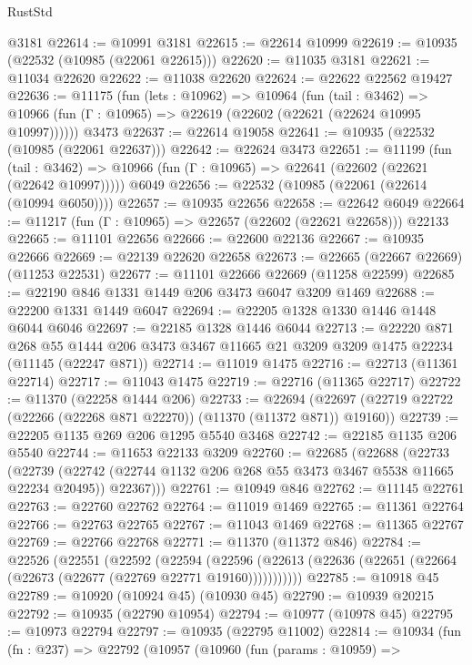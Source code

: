 \begin{lexlean}{RustStd}
\begin{coremodule}
{\begin{coremodule}
{{{{{{{{{{{{{{{{{{{{{{{{{{{{{{{{{{{{{{{{{{{{{{{{{{{{{{{{{{{{{{{{{{{{{{{{{{{{{{{{{{{{{    @3181
@22614 := @10991 @3181
@22615 := @22614 @10999
@22619 := @10935 (@22532 (@10985 (@22061 @22615)))
@22620 := @11035 @3181
@22621 := @11034 @22620
@22622 := @11038 @22620
@22624 := @22622 @22562 @19427
@22636 := @11175
    (fun (lets : @10962) =>
    @10964
      (fun (tail : @3462) =>
      @10966 (fun (Γ : @10965) => @22619 (@22602 (@22621 (@22624 @10995 @10997))))))
    @3473
@22637 := @22614 @19058
@22641 := @10935 (@22532 (@10985 (@22061 @22637)))
@22642 := @22624 @3473
@22651 := @11199
    (fun (tail : @3462) => @10966 (fun (Γ : @10965) => @22641 (@22602 (@22621 (@22642 @10997)))))
    @6049
@22656 := @22532 (@10985 (@22061 (@22614 (@10994 @6050))))
@22657 := @10935 @22656
@22658 := @22642 @6049
@22664 := @11217 (fun (Γ : @10965) => @22657 (@22602 (@22621 @22658))) @22133
@22665 := @11101 @22656
@22666 := @22600 @22136
@22667 := @10935 @22666
@22669 := @22139 @22620 @22658
@22673 := @22665 (@22667 @22669) (@11253 @22531)
@22677 := @11101 @22666 @22669 (@11258 @22599)
@22685 := @22190 @846 @1331 @1449 @206 @3473 @6047 @3209 @1469
@22688 := @22200 @1331 @1449 @6047
@22694 := @22205 @1328 @1330 @1446 @1448 @6044 @6046
@22697 := @22185 @1328 @1446 @6044
@22713 := @22220
    @871
    @268
    @55
    @1444
    @206
    @3473
    @3467
    @11665
    @21
    @3209
    @3209
    @1475
    @22234
    (@11145 (@22247 @871))
@22714 := @11019 @1475
@22716 := @22713 (@11361 @22714)
@22717 := @11043 @1475
@22719 := @22716 (@11365 @22717)
@22722 := @11370 (@22258 @1444 @206)
@22733 := @22694
    (@22697 (@22719 @22722 (@22266 (@22268 @871 @22270)) (@11370 (@11372 @871)) @19160))
@22739 := @22205 @1135 @269 @206 @1295 @5540 @3468
@22742 := @22185 @1135 @206 @5540
@22744 := @11653 @22133 @3209
@22760 := @22685
    (@22688
      (@22733
        (@22739
          (@22742 (@22744 @1132 @206 @268 @55 @3473 @3467 @5538 @11665 @22234 @20495))
          @22367)))
@22761 := @10949 @846
@22762 := @11145 @22761
@22763 := @22760 @22762
@22764 := @11019 @1469
@22765 := @11361 @22764
@22766 := @22763 @22765
@22767 := @11043 @1469
@22768 := @11365 @22767
@22769 := @22766 @22768
@22771 := @11370 (@11372 @846)
@22784 := @22526
    (@22551
      (@22592
        (@22594
          (@22596 (@22613 (@22636 (@22651 (@22664 (@22673 (@22677 (@22769 @22771 @19160)))))))))))
@22785 := @10918 @45
@22789 := @10920 (@10924 @45) (@10930 @45)
@22790 := @10939 @20215
@22792 := @10935 (@22790 @10954)
@22794 := @10977 (@10978 @45)
@22795 := @10973 @22794
@22797 := @10935 (@22795 @11002)
@22814 := @10934
    (fun (fn : @237) =>
    @22792
      (@10957
        (@10960
          (fun (params : @10959) =>
}}}}}}}}}}}}}}}}}}}}}}}}}}}}}}}}}}}}}}}}}}}}}}}}}}}}}}}}}}}}}}}}}}}}}}}}}}}}}}}}}}}}}
\end{coremodule}}
\end{coremodule}
\end{lexlean}
